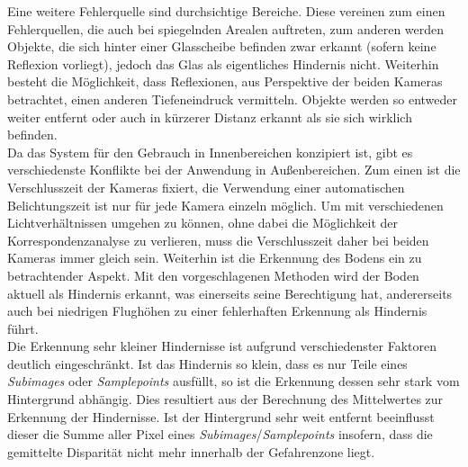 \noindent
Eine weitere Fehlerquelle sind durchsichtige Bereiche. Diese vereinen zum einen Fehlerquellen, die auch bei spiegelnden Arealen auftreten, zum anderen werden Objekte, die sich hinter einer Glasscheibe befinden zwar erkannt (sofern keine Reflexion vorliegt), jedoch das Glas als eigentliches Hindernis nicht. Weiterhin besteht die Möglichkeit, dass Reflexionen, aus Perspektive der beiden Kameras betrachtet, einen anderen Tiefeneindruck vermitteln. Objekte werden so entweder weiter entfernt oder auch in kürzerer Distanz erkannt als sie sich wirklich befinden.\\

\noindent
Da das System für den Gebrauch in Innenbereichen konzipiert ist, gibt es verschiedenste Konflikte bei der Anwendung in Außenbereichen. Zum einen ist die Verschlusszeit der Kameras fixiert, die Verwendung einer automatischen Belichtungszeit ist nur für jede Kamera einzeln möglich. Um mit verschiedenen Lichtverhältnissen umgehen zu können, ohne dabei die Möglichkeit der Korrespondenzanalyse zu verlieren, muss die Verschlusszeit daher bei beiden Kameras immer gleich sein. Weiterhin ist die Erkennung des Bodens ein zu betrachtender Aspekt. Mit den vorgeschlagenen Methoden wird der Boden aktuell als Hindernis erkannt, was einerseits seine Berechtigung hat, andererseits auch bei niedrigen Flughöhen zu einer fehlerhaften Erkennung als Hindernis führt.\\

\noindent
Die Erkennung sehr kleiner Hindernisse ist aufgrund verschiedenster Faktoren deutlich eingeschränkt. Ist das Hindernis so klein, dass es nur Teile eines \emph{Subimages} oder \emph{Samplepoints} ausfüllt, so ist die Erkennung dessen sehr stark vom Hintergrund abhängig. Dies resultiert aus der Berechnung des Mittelwertes zur Erkennung der Hindernisse. Ist der Hintergrund sehr weit entfernt beeinflusst dieser die Summe aller Pixel eines \emph{Subimages}/\emph{Samplepoints} insofern, dass die gemittelte Disparität nicht mehr innerhalb der Gefahrenzone liegt. 


